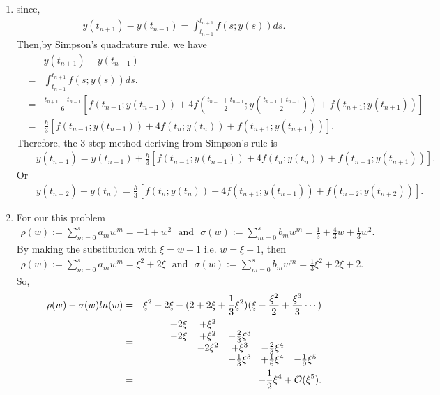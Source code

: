 \documentclass[12pt]  {article}%
\begin{document}
\begin{solution}
\begin{enumerate}
  \item {}

since,
\begin{eqnarray}
y(t_{n+1})-y(t_{n-1})=\int_{t_{n-1}}^{t_{n+1}}f(s; y(s))ds.
\end{eqnarray}
Then,by Simpson's quadrature rule, we have 
\begin{eqnarray}
&&y(t_{n+1})-y(t_{n-1})\\
&=&\int_{t_{n-1}}^{t_{n+1}}f(s; y(s))ds.\\
&=&\frac{t_{n+1}-t_{n-1}}{6}\left[f(t_{n-1};y(t_{n-1}))+4f\left(\frac{t_{n-1}+t_{n+1}}{2};y\left(\frac{t_{n-1}+t_{n+1}}{2}\right)\right)+f(t_{n+1};y(t_{n+1}))\right]\\
&=&\frac{h}{3}\left[f(t_{n-1};y(t_{n-1}))+4f\left(t_n;y\left(t_n\right)\right)+f(t_{n+1};y(t_{n+1}))\right].
\end{eqnarray}
Therefore, the 3-step method deriving from Simpson's rule is 
\begin{eqnarray}
&&y(t_{n+1})=y(t_{n-1})
+\frac{h}{3}\left[f(t_{n-1};y(t_{n-1}))+4f\left(t_n;y\left(t_n\right)\right)+f(t_{n+1};y(t_{n+1}))\right].
\end{eqnarray}
Or
\begin{eqnarray}
&&y(t_{n+2})-y(t_{n})
=\frac{h}{3}\left[f(t_{n};y(t_{n}))+4f\left(t_{n+1};y\left(t_{n+1}\right)\right)+f(t_{n+2};y(t_{n+2}))\right].
\end{eqnarray}

  \item {}
  For our this problem 
\begin{eqnarray}
\rho(w) :=\sum_{m=0}^{s} a_m w^m=-1+w^2 ~~~\text{and} ~~~\sigma(w):=\sum_{m=0}^{s} b_m w^m=\frac{1}{3}+\frac{4}{3}w+\frac{1}{3}w^2.
\end{eqnarray}
By making the substitution with $\xi=w-1$ i.e. $w=\xi+1$, then
\begin{eqnarray}
\rho(w) :=\sum_{m=0}^{s} a_m w^m=\xi^2+2\xi ~~~\text{and} ~~~\sigma(w):=\sum_{m=0}^{s} b_m w^m=\frac{1}{3}\xi^2+2\xi+2.
\end{eqnarray}
So,
\begin{eqnarray*}
\rho(w)-\sigma(w)ln(w)&=&\xi^2+2\xi-(2+2\xi+\frac{1}{3}\xi^2)(\xi-\frac{\xi^2}{2}+\frac{\xi^3}{3}\cdots)\\
&=&\begin{array}{ccccc}
        +2\xi & +\xi^2&  & & \\
        -2\xi &+\xi^2 & -\frac{2}{3}\xi^3&&\\
              &-2\xi^2 &+\xi^3 &-\frac{2}{3}\xi^4&\\
              &  & -\frac{1}{3}\xi^3 &+\frac{1}{6}\xi^4&- \frac{1}{9}\xi^5 \\
\end{array}\\
&=&-\frac{1}{2}\xi^4+\mathcal{O}{(\xi^5)}.
\end{eqnarray*}


\end{enumerate}
\end{solution}
\end{document}
